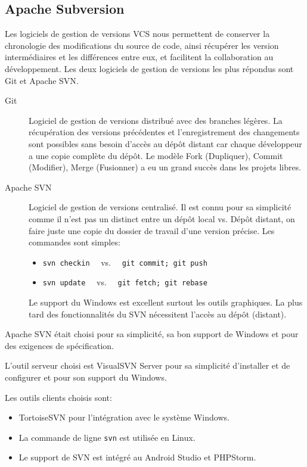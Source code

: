 \subsection{Apache Subversion}

Les logiciels de gestion de versions \acrshort{VCS} nous permettent de
conserver la chronologie des modifications du source de code, ainsi récupérer
les version intermédiaires et les différences entre eux, et facilitent la
collaboration au développement. Les deux logiciels de gestion de versions les
plus répondus sont Git et Apache SVN\@.

\begin{description}
    \item [Git] Logiciel de gestion de versions distribué avec des branches
        légères. La récupération des versions précédentes et l'enregistrement
        des changements sont possibles sans besoin d'accès au dépôt distant car
        chaque développeur a une copie complète du dépôt. Le modèle Fork
        (Dupliquer), Commit (Modifier), Merge (Fusionner) a eu un grand succès
        dans les projets libres.
    \item [Apache SVN] Logiciel de gestion de versions centralisé. Il est connu
        pour sa simplicité comme il n'est pas un distinct entre un dépôt local
        vs. Dépôt distant, on faire juste une copie du dossier de travail d'une
        version précise. Les commandes sont simples:
        \begin{itemize}
            \item \verb|svn checkin| \ \ vs. \ \ \verb|git commit; git push|
            \item \verb|svn update| \ \ vs. \ \ \verb|git fetch; git rebase|
        \end{itemize}
        Le support du Windows est excellent surtout les outils graphiques. La
        plus tard des fonctionnalités du SVN nécessitent l'accès au dépôt
        (distant).
\end{description}

Apache SVN était choisi pour sa simplicité, sa bon support de Windows et pour
des exigences de spécification.

L'outil serveur choisi est VisualSVN Server pour sa simplicité d'installer et
de configurer et pour son support du Windows.

Les outils clients choisis sont:

\begin{itemize}
    \item TortoiseSVN pour l'intégration avec le système Windows.
    \item La commande de ligne \verb|svn| est utilisée en Linux.
    \item Le support de SVN est intégré au Android Studio et PHPStorm.
\end{itemize}

